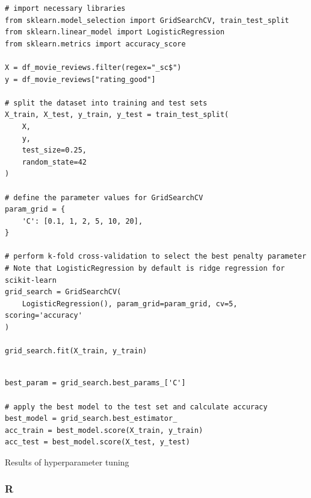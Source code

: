 \documentclass[
  letterpaper,
]{krantz}
\begin{document}
\begin{verbatim}
# import necessary libraries
from sklearn.model_selection import GridSearchCV, train_test_split
from sklearn.linear_model import LogisticRegression
from sklearn.metrics import accuracy_score

X = df_movie_reviews.filter(regex="_sc$")
y = df_movie_reviews["rating_good"]

# split the dataset into training and test sets
X_train, X_test, y_train, y_test = train_test_split(
    X, 
    y, 
    test_size=0.25, 
    random_state=42
)

# define the parameter values for GridSearchCV
param_grid = {
    'C': [0.1, 1, 2, 5, 10, 20],
}

# perform k-fold cross-validation to select the best penalty parameter
# Note that LogisticRegression by default is ridge regression for scikit-learn
grid_search = GridSearchCV(
    LogisticRegression(), param_grid=param_grid, cv=5, scoring='accuracy'
)

grid_search.fit(X_train, y_train)
\end{verbatim}

\begin{verbatim}

best_param = grid_search.best_params_['C']

# apply the best model to the test set and calculate accuracy
best_model = grid_search.best_estimator_
acc_train = best_model.score(X_train, y_train)
acc_test = best_model.score(X_test, y_test)
\end{verbatim}

\begin{table}

\caption{\label{tbl-tune-results-py}Results of hyperparameter tuning}


\end{table}%

\subsubsection{R}
\end{document}
